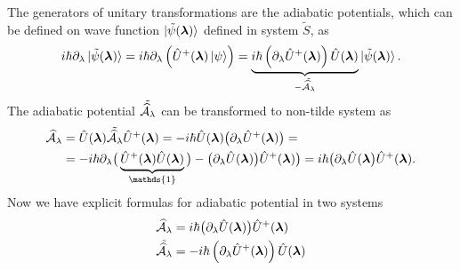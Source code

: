 




The generators of unitary transformations are the adiabatic potentials, which can be defined on wave function $\ket{\tilde\psi(\llambda)}$ defined in system $\tilde S$, as
\begin{equation}
    i\hbar\partial_\lambda \ket{\tilde{\psi}(\llambda)} = i\hbar \partial_\lambda\left(\U^+(\llambda)\ket{\psi} \right)= \underbrace{i\hbar\left(\partial_\lambda \U^+(\llambda)\right)\U(\llambda)}_{-\tilde{\AA_\lambda}}\ket{\tilde{\psi}(\llambda)}.
\end{equation}
The adiabatic potential $\tilde{\AA_\lambda}$ can be transformed to non-tilde system as
\begin{equation}
    \begin{split}
        \AA_\lambda&=\U(\llambda)\tilde{\AA_\lambda}\U^+(\llambda) = -i\hbar\U(\llambda)\big(\partial_\lambda \U^+(\llambda)\big) =\\
        &= -i\hbar\partial_\lambda\big(\underbrace{\U^+(\llambda)\U(\llambda)}_{\mathds{1}}\big)-\big(\partial_\lambda \U(\llambda)\big)\U^+(\llambda) \big) =i\hbar \big(\partial_\lambda \U(\llambda\big)\U^+(\llambda).
    \end{split}
\end{equation}
Now we have explicit formulas for adiabatic potential in two systems
\begin{align}
    \AA_\lambda&=i\hbar \big(\partial_\lambda \U(\llambda)\big)\U^+(\llambda)
    \label{eq:adiabaticPotential}\\
    \tilde{\AA_\lambda} &= -i\hbar\left(\partial_\lambda \U^+(\llambda)\right)\U(\llambda)
    \label{eq:adiabaticPotentialTilde}
\end{align}

